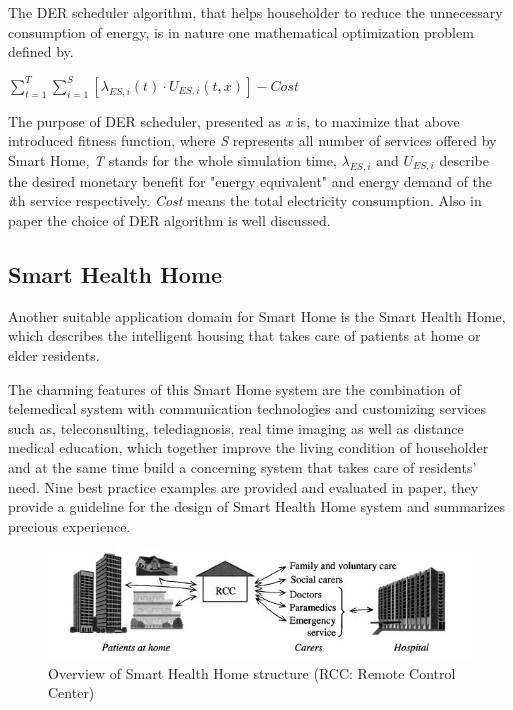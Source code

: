 The DER scheduler algorithm, that helps householder to reduce the unnecessary consumption of energy, is in nature one mathematical optimization problem defined by\cite{smart_home_for_energy}.
\begin{center}
 $ \sum_{t=1}^{T}\sum_{i=1}^{S}[\lambda_{ES,i}(t)\cdot {U_{ES,i}}(t,x)]-Cost$
\end{center}

The purpose of DER scheduler, presented as \emph{x} is, to maximize that above introduced fitness function, where \emph{S} represents all number of services offered by Smart Home, \emph{T} stands for the whole simulation time, $\lambda_{ES,i}$ and $ U_{ES,i}$ describe the desired monetary benefit for "energy equivalent" and energy demand of the \emph{i}th service respectively. \emph{Cost} means the total electricity consumption. Also in paper\cite{smart_home_for_energy} the choice of DER algorithm is well discussed.


\subsection{Smart Health Home}
Another suitable application domain for Smart Home is the Smart Health Home, which describes the intelligent housing that takes care of patients at home or elder residents.

The charming features of this Smart Home system are the combination of telemedical system with communication technologies and customizing services such as, teleconsulting, telediagnosis, real time imaging as well as distance medical education\cite{smart_home_for_health}, which together improve the living condition of householder and at the same time build a concerning system that takes care of residents' need. Nine best practice examples are provided and evaluated in paper\cite{smart_home_for_old}, they provide a guideline for  the design of Smart Health Home system and summarizes precious experience. 
 \begin{figure}[!htbp]
	\centering
	\includegraphics[width=1.0\textwidth]{rcc.jpg}
		\caption{Overview of Smart Health Home structure\cite{smart_home_for_health} (RCC: Remote Control Center)}
	\label{fig:rcc}
\end{figure}

